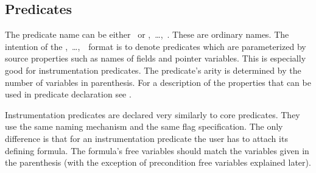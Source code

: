 \subsection{Predicates}
\label{Se:Predicates}

The predicate name can be either \pid\ or
\pid\blb\pid,~\ldots,~\pid\brb.
These are ordinary names.
The intention of the \pid\blb\pid,~\ldots,~\pid\brb\ format is to denote predicates which are
parameterized by source properties such as names of fields and pointer variables.
This is especially good for instrumentation predicates.
The predicate's arity is
determined by the number of variables in parenthesis.
For a description of the properties that can be used in predicate
declaration see .


Instrumentation predicates are declared very similarly to core
predicates.  They use the same naming mechanism and the same flag
specification.  The only difference is that for an instrumentation
predicate the user has to attach its defining formula. The
formula's free variables should match the variables given in the
parenthesis (with the exception of precondition free variables
explained later).

